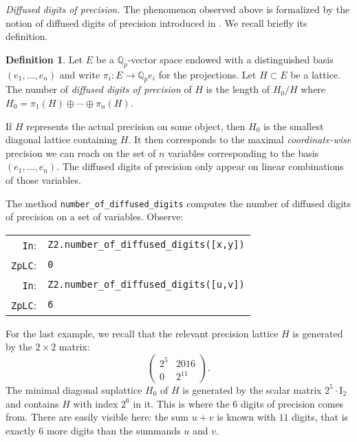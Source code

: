 \documentclass[sigconf]{acmart}
\newcommand{\Q}{\mathbb Q}
\newcommand{\Qp}{\Q_p}
\newcommand{\cIn}{{\color{input} \tt \phantom{Zp}In}:}
\newcommand{\cZpLC}{{\color{output} \tt ZpLC}:}
\theoremstyle{definition}
\newtheorem{deftn}[theo]{Definition}
\begin{document}
\medskip

\noindent \textit{Diffused digits of precision.}
%
The phenomenon observed above is formalized by the notion of diffused
digits of precision introduced in \cite{caruso-roe-vaccon:15}.
We recall briefly its definition.

\begin{deftn}
\label{def:diffused}
Let $E$ be a $\Qp$-vector space endowed with a distinguished basis 
$(e_1, \ldots, e_n)$ and write $\pi_i : E \to \Qp e_i$ for the 
projections.
Let $H \subset E$ be a lattice. The number of \emph{diffused digits of 
precision} of $H$ is the length of $H_0/H$ where $H_0 = \pi_1(H) \oplus 
\cdots \oplus \pi_n(H)$.
\end{deftn}

If $H$ represents the actual precision on some object, then
$H_0$ is the smallest diagonal lattice containing $H$. It then
corresponds to the maximal \emph{coordinate-wise} precision we can 
reach on the set of $n$ variables corresponding to the basis $(e_1,
\ldots, e_n)$.
The diffused digits of precision only appear on linear combinations
of those variables.

The method {\color{method}\verb?number_of_diffused_digits?} computes the number of
diffused digits of precision on a set of variables. Observe:

\smallskip

{\noindent \small
\begin{tabular}{rl}
\cIn   & {\color{ring}\verb?Z2?}\verb?.?{\color{method}\verb?number_of_diffused_digits?}\verb?([x,y])? \\
\cZpLC & \verb?0? \\
\cIn   & {\color{ring}\verb?Z2?}\verb?.?{\color{method}\verb?number_of_diffused_digits?}\verb?([u,v])? \\
\cZpLC & \verb?6? \\
\end{tabular}}

\smallskip

\noindent
For the last example, we recall that the relevant precision lattice 
$H$ is generated by the $2 \times 2$ matrix:
$$\left(\begin{matrix} 2^5 & 2016 \\ 0 & 2^{11} \end{matrix}\right).$$
The minimal diagonal suplattice $H_0$ of $H$ is generated by the scalar matrix 
$2^5 \cdot \text{I}_2$ and contains $H$ with index $2^6$ in it. This is 
where the $6$ digits of precision comes from.
There are easily visible here: the sum $u+v$ is known with $11$ digits,
that is exactly $6$ more digits than the summands $u$ and $v$.
\end{document}
